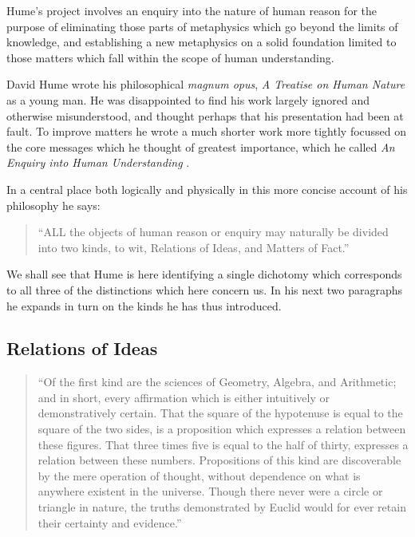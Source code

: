 Hume's project involves an enquiry into the nature of human reason for
the purpose of eliminating those parts of metaphysics which go beyond
the limits of knowledge, and establishing a new metaphysics on a
solid foundation limited to those matters which fall within the scope
of human understanding.

David Hume wrote his philosophical \emph{magnum opus}, \emph{A Treatise on
  Human Nature} \cite{humeTHN} as a young man.
He was disappointed to find his work largely ignored and otherwise
misunderstood, and thought perhaps that his presentation had been at
fault.
To improve matters he wrote a much shorter work more tightly focussed
on the core messages which he thought of greatest importance, which he
called \emph{An Enquiry into Human Understanding}
\cite{humeECHU}.

In a central place both logically and physically in this more concise
account of his philosophy he says:

\begin{quote}
``ALL the objects of human reason or enquiry may naturally be divided
  into two kinds, to wit, Relations of Ideas, and Matters of Fact.'' 
\end{quote}

We shall see that Hume is here identifying a single dichotomy which
corresponds to all three of the distinctions which here concern us.
In his next two paragraphs he expands in turn on the kinds he has thus
introduced.

\subsection{Relations of Ideas}

\begin{quote}
``Of the first kind are the sciences of Geometry, Algebra, and
Arithmetic; and in short, every affirmation which is either
intuitively or demonstratively certain.
That the square of the hypotenuse is equal to the square of the two
sides, is a proposition which expresses a relation between these
figures.
That three times five is equal to the half of thirty, expresses a
relation between these numbers.
Propositions of this kind are discoverable by the mere operation of
thought, without dependence on what is anywhere existent in the
universe.
Though there never were a circle or triangle in nature, the truths
demonstrated by Euclid would for ever retain their certainty and
evidence.''
\end{quote}

